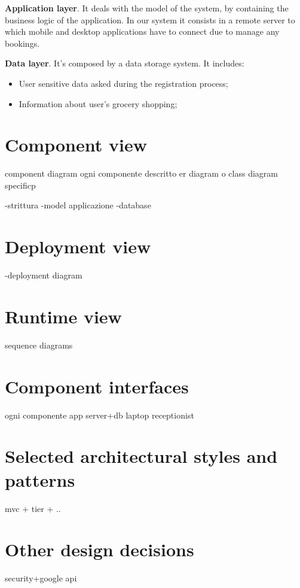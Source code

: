 \textbf{Application layer}. It deals with the model of the system, by containing the business logic of the application. In our system it consists in a remote server to which mobile and desktop applications have to connect due to manage any bookings.

\textbf{Data layer}. It's composed by a data storage system. It includes: 

\begin{itemize}
\item User sensitive data asked during the registration process;
\item Information about user's grocery shopping;
\end{itemize}



\section{Component view}
component diagram ogni componente descritto
er diagram o class diagram specificp

-strittura
-model applicazione
-database


\section{Deployment view}
-deployment diagram

\section{Runtime view}
sequence diagrams

\section{Component interfaces}
ogni componente
app
server+db
laptop receptionist

\section{Selected architectural styles and patterns}
mvc + tier + ..

\section{Other design decisions}

security+google api

